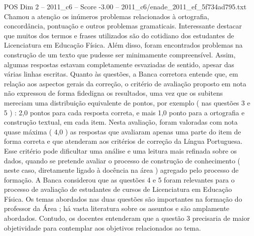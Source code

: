 \begin{textsample}{POS Dim 2 – 2011\_c6 – Score -3.00 – 2011\_c6/enade\_2011\_ef\_5f734ad795.txt}
Chamou a atenção os inúmeros problemas relacionados à ortografia, concordância, pontuação e outros problemas gramaticais.
Interessante destacar que muitos dos termos e frases utilizados são do cotidiano dos estudantes de Licenciatura em Educação Física.
Além disso, foram encontrados problemas na construção de um texto que pudesse ser minimamente compreensível.
Assim, algumas respostas estavam completamente esvaziadas de sentido, apesar das várias linhas escritas.
Quanto às questões, a Banca corretora entende que, em relação aos aspectos gerais da correção, o critério de avaliação proposto em nota não expressou de forma fidedigna os resultados, uma vez que os subitens mereciam uma distribuição equivalente de pontos, por exemplo ( nas questões 3 e 5 ) : 2,0 pontos para cada resposta correta, e mais 1,0 ponto para a ortografia e construção textual, em cada item.
Nesta avaliação, foram valoradas com nota quase máxima ( 4,0 ) as respostas que avaliaram apenas uma parte do item de forma correta e que atenderam aos critérios de correção da Língua Portuguesa.
Esse critério pode dificultar uma análise e uma leitura mais refinada sobre os dados, quando se pretende avaliar o processo de construção de conhecimento ( neste caso, diretamente ligado à docência na área ) agregado pelo processo de formação.
A Banca considerou que as questões 4 e 5 foram relevantes para o processo de avaliação de estudantes de cursos de Licenciatura em Educação Física.
Os temas abordados nas duas questões são importantes na formação do professor da Área ; há vasta literatura sobre os assuntos e são amplamente abordados.
Contudo, os docentes entenderam que a questão 3 precisaria de maior objetividade para contemplar aos objetivos relacionados ao tema.

\end{textsample}
